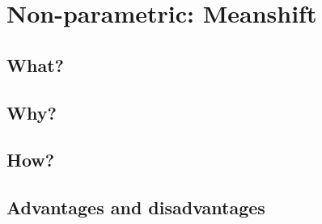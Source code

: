 \section{Non-parametric: Meanshift}

\subsection{What?}

\subsection{Why?}

\subsection{How?}

\subsection{Advantages and disadvantages}